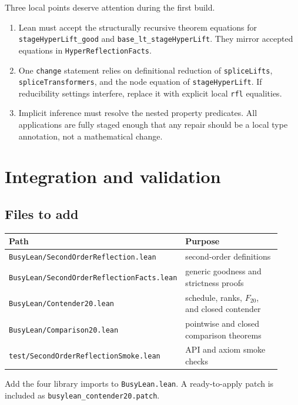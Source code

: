 \documentclass[11pt]{article}
\theoremstyle{definition}
\theoremstyle{remark}
\newcommand{\lean}[1]{\nolinkurl{#1}}
\begin{document}
Three local points deserve attention during the first build.

\begin{enumerate}[leftmargin=*]
\item Lean must accept the structurally recursive theorem equations for
  \lean{stageHyperLift_good} and \lean{base_lt_stageHyperLift}. They mirror
  accepted equations in \lean{HyperReflectionFacts}.
\item One \lean{change} statement relies on definitional reduction of
  \lean{spliceLifts}, \lean{spliceTransformers}, and the node equation of
  \lean{stageHyperLift}. If reducibility settings interfere, replace it with
  explicit local \lean{rfl} equalities.
\item Implicit inference must resolve the nested property predicates. All
  applications are fully staged enough that any repair should be a local type
  annotation, not a mathematical change.
\end{enumerate}

\section{Integration and validation}

\subsection{Files to add}

\begin{longtable}{p{0.46\linewidth}p{0.46\linewidth}}
\toprule
Path & Purpose\\
\midrule
\endhead
\lean{BusyLean/SecondOrderReflection.lean} & second-order definitions\\
\lean{BusyLean/SecondOrderReflectionFacts.lean} & generic goodness and strictness proofs\\
\lean{BusyLean/Contender20.lean} & schedule, ranks, $F_{20}$, and closed contender\\
\lean{BusyLean/Comparison20.lean} & pointwise and closed comparison theorems\\
\lean{test/SecondOrderReflectionSmoke.lean} & API and axiom smoke checks\\
\bottomrule
\end{longtable}

Add the four library imports to \lean{BusyLean.lean}. A ready-to-apply patch is
included as \lean{busylean_contender20.patch}.
\end{document}
